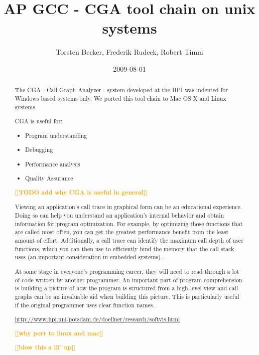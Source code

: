 \documentclass[a4paper,11pt]{article}
\title{AP GCC - CGA tool chain on unix systems}
\author{ Torsten Becker, Frederik Rudeck, Robert Timm }
\date{2009-08-01}
\newcommand{\todo}[1]{\textsf{\textbf{\textcolor{Orange}{[[#1]]}}}}
\begin{document}
\lstset{language=C++}

\ifpdf {} \else {} \fi

\maketitle
\begin{abstract}
	The CGA - Call Graph Analyzer - system developed at the HPI was indented for Windows based systems only. We ported this tool chain to Mac OS X and Linux systems.

CGA is useful for:

\begin{itemize}
	\item Program understanding
	\item Debugging
	\item Performance analysis
	\item Quality Assurance
\end{itemize}

\todo{TODO add why CGA is useful in general}

Viewing an application's call trace in graphical form can be an educational experience. Doing so can help you understand an application's internal behavior and obtain information for program optimization. For example, by optimizing those functions that are called most often, you can get the greatest performance benefit from the least amount of effort. Additionally, a call trace can identify the maximum call depth of user functions, which you can then use to efficiently bind the memory that the call stack uses (an important consideration in embedded systems).

At some stage in everyone's programming career, they will need to read through a lot of code written by another programmer. An important part of program comprehension is building a picture of how the program is structured from a high-level view and call graphs can be an invaluable aid when building this picture. This is particularly useful if the original programmer uses clear function names.

\url{http://www.hpi.uni-potsdam.de/doellner/research/softvis.html}

\todo{why port to linux and mac}
	
\todo{blow this a lil' up}
\end{abstract}

\newpage
\end{document}

